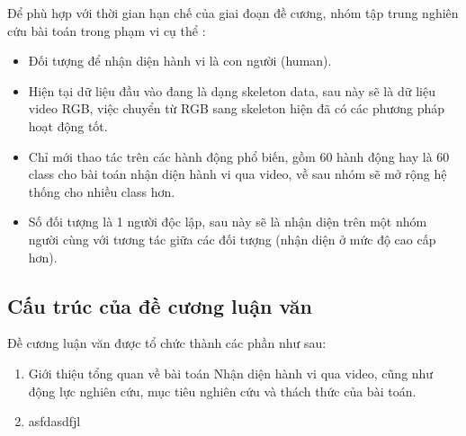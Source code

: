Để phù hợp với thời gian  hạn chế của giai đoạn đề cương, nhóm tập trung nghiên cứu bài toán trong phạm vi cụ thể :
\begin{itemize}
    \item Đối tượng để nhận diện hành vi là con người (human).
    \item Hiện tại dữ liệu đầu vào đang là dạng skeleton data, sau này sẽ là dữ liệu video RGB, việc chuyển từ RGB sang skeleton hiện
          đã có các phương pháp hoạt động tốt.
    \item Chỉ mới thao tác trên các hành động phổ biến, gồm 60 hành động hay là 60 class cho bài toán nhận diện hành vi qua video, về sau nhóm sẽ mở rộng
          hệ thống cho nhiều class hơn.
    \item Số đối tượng là 1 người độc lập, sau này sẽ là nhận diện trên một nhóm người cùng với tương tác giữa các đối tượng (nhận diện ở mức độ cao cấp hơn).
\end{itemize}

\subsection{Cấu trúc của đề cương luận văn}
Đề cương luận văn được tổ chức thành các phần như sau:


\begin{enumerate}[Chương 1]
    \item Giới thiệu tổng quan về bài toán Nhận diện hành vi qua video, cũng như động lực nghiên cứu, mục tiêu nghiên cứu và thách thức của bài toán.
    \item asfdasdfjl

\end{enumerate}


